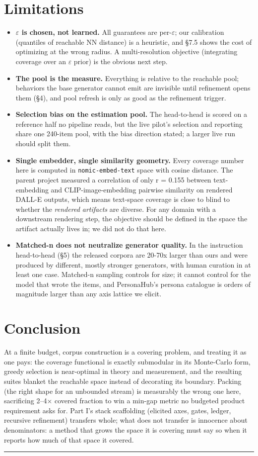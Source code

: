 \documentclass[11pt]{article}
\theoremstyle{plain}
\theoremstyle{definition}
\begin{document}
\section{Limitations}
\begin{itemize}
  \item \textbf{$\varepsilon$ is chosen, not learned.} All guarantees are per-$\varepsilon$; our calibration (quantiles of reachable NN distance) is a heuristic, and \S{}7.5 shows the cost of optimizing at the wrong radius. A multi-resolution objective (integrating coverage over an $\varepsilon$ prior) is the obvious next step.
  \item \textbf{The pool is the measure.} Everything is relative to the reachable pool; behaviors the base generator cannot emit are invisible until refinement opens them (\S{}4), and pool refresh is only as good as the refinement trigger.
  \item \textbf{Selection bias on the estimation pool.} The head-to-head is scored on a reference half no pipeline reads, but the live pilot's selection and reporting share one 240-item pool, with the bias direction stated; a larger live run should split them.
  \item \textbf{Single embedder, single similarity geometry.} Every coverage number here is computed in \texttt{nomic-embed-text} space with cosine distance. The parent project measured a correlation of only r = 0.155 between text-embedding and CLIP-image-embedding pairwise similarity on rendered DALL-E outputs, which means text-space coverage is close to blind to whether the \emph{rendered artifacts} are diverse. For any domain with a downstream rendering step, the objective should be defined in the space the artifact actually lives in; we did not do that here.
  \item \textbf{Matched-n does not neutralize generator quality.} In the instruction head-to-head (\S{}5) the released corpora are 20-70x larger than ours and were produced by different, mostly stronger generators, with human curation in at least one case. Matched-n sampling controls for size; it cannot control for the model that wrote the items, and PersonaHub's persona catalogue is orders of magnitude larger than any axis lattice we elicit.
\end{itemize}

\section{Conclusion}
At a finite budget, corpus construction is a covering problem, and treating it as one pays: the coverage functional is exactly submodular in its Monte-Carlo form, greedy selection is near-optimal in theory and measurement, and the resulting suites blanket the reachable space instead of decorating its boundary. Packing (the right shape for an unbounded stream) is measurably the wrong one here, sacrificing 2--4$\times$ covered fraction to win a min-gap metric no budgeted product requirement asks for. Part I's stack scaffolding (elicited axes, gates, ledger, recursive refinement) transfers whole; what does not transfer is innocence about denominators: a method that grows the space it is covering must say so when it reports how much of that space it covered.

\bigskip\hrule\bigskip
\end{document}
